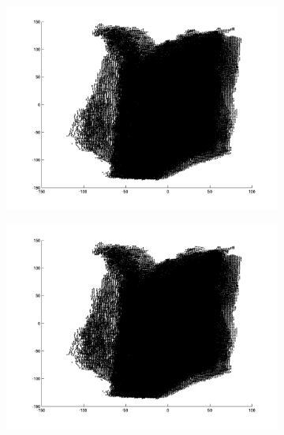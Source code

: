 \begin{figure}
	\begin{subfigure}[b]{0.3\textwidth}
		\centering
		\includegraphics[width=\textwidth]{Images/Book13.png}
		\caption{}
	\end{subfigure}%
	\begin{subfigure}[b]{0.3\textwidth}
		\centering
		\includegraphics[width=\textwidth]{Images/Book14.png}
		\caption{}
	\end{subfigure}
	\begin{subfigure}[b]{0.3\textwidth}
		\centering

\end{subfigure}
\end{figure}
